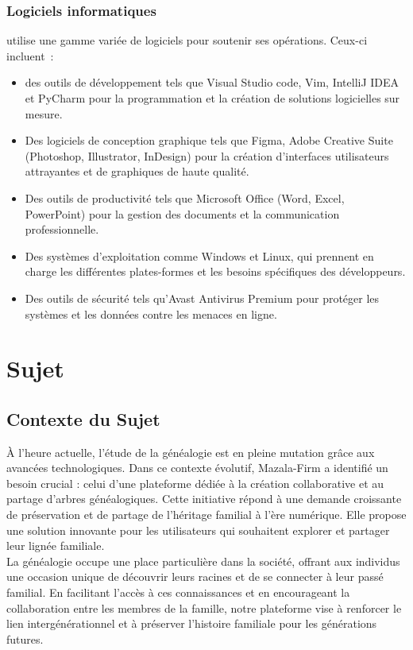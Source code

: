 \subsubsection   { Logiciels informatiques }
\firm utilise une gamme variée de logiciels pour soutenir ses opérations. Ceux-ci incluent :
\begin{itemize}

  \item des outils de développement tels que Visual Studio code, Vim, IntelliJ IDEA et
    PyCharm pour la programmation et la création de solutions logicielles sur mesure.
  \item Des logiciels de conception graphique tels que Figma, Adobe Creative Suite
    (Photoshop, Illustrator, InDesign) pour la création d’interfaces utilisateurs
    attrayantes et de graphiques de haute qualité.
  \item Des outils de productivité tels que Microsoft Office (Word, Excel, PowerPoint)
    pour la gestion des documents et la communication professionnelle.
  \item Des systèmes d’exploitation comme Windows et Linux, qui prennent en charge
    les différentes plates-formes et les besoins spécifiques des développeurs.
  \item Des outils de sécurité tels qu’Avast Antivirus Premium pour protéger les
    systèmes et les données contre les menaces en ligne.
\end{itemize}

\newpage


\section{Sujet}
\subsection{Contexte du Sujet}

À l'heure actuelle, l'étude de la généalogie est en pleine mutation grâce aux
avancées technologiques. Dans ce contexte évolutif, Mazala-Firm a identifié un
besoin crucial : celui d'une plateforme dédiée à la création collaborative et au
partage d'arbres généalogiques. Cette initiative répond à une demande croissante de
préservation et de partage de l’héritage familial à l’ère numérique. Elle
propose une solution innovante pour les utilisateurs qui souhaitent explorer et
partager leur lignée familiale. \\


La généalogie occupe une place particulière dans la société, offrant aux individus
une occasion unique de découvrir leurs racines et de se connecter à leur passé
familial. En facilitant l’accès à ces connaissances et en encourageant la
collaboration entre les membres de la famille, notre plateforme vise à renforcer
le lien intergénérationnel et à préserver l’histoire familiale pour les générations futures. \\

